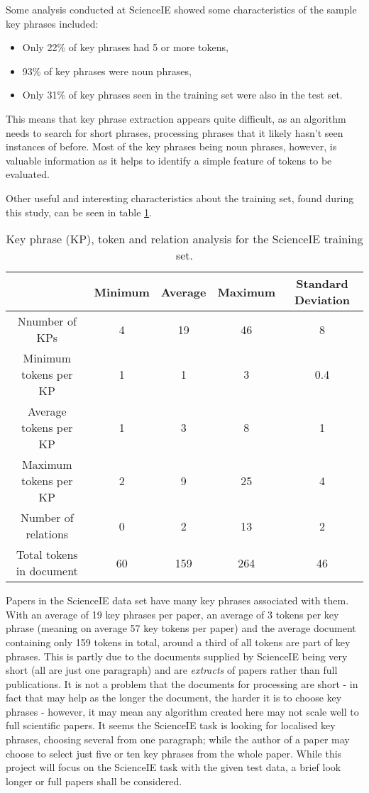 Some analysis conducted at ScienceIE \cite{Augenstein2017} showed some characteristics of the sample key phrases included:
\begin{itemize}
	\item Only 22\% of key phrases had 5 or more tokens,
	\item 93\% of key phrases were noun phrases,
	\item Only 31\% of key phrases seen in the training set were also in the test set.
\end{itemize}

This means that key phrase extraction appears quite difficult, as an algorithm needs to search for short phrases, processing phrases that it likely hasn't seen instances of before. Most of the key phrases being noun phrases, however, is valuable information as it helps to identify a simple feature of tokens to be evaluated.

Other useful and interesting characteristics about the training set, found during this study, can be seen in table \ref{table:traininganalysis}. 

\begin{table}
	\centering
	\begin{tabular}{ c | c c c c }
		& \textbf{Minimum} & \textbf{Average} & \textbf{Maximum} & \textbf{Standard Deviation} \\
		\hline
		Nnumber of KPs & 4 & 19 & 46 & 8 \\
		Minimum tokens per KP & 1 & 1 & 3 & 0.4 \\
		Average tokens per KP & 1 & 3 & 8 & 1 \\
		Maximum tokens per KP & 2 & 9 & 25 & 4 \\
		Number of relations & 0 & 2 & 13 & 2 \\
		Total tokens in document & 60 & 159 & 264 & 46
	\end{tabular}
	\caption[ScienceIE Training Set Analysis]{Key phrase (KP), token and relation analysis for the ScienceIE training set.}
	\label{table:traininganalysis}
\end{table}

Papers in the ScienceIE data set have many key phrases associated with them. With an average of 19 key phrases per paper, an average of 3 tokens per key phrase (meaning on average 57 key tokens per paper) and the average document containing only 159 tokens in total, around a third of all tokens are part of key phrases. This is partly due to the documents supplied by ScienceIE being very short (all are just one paragraph) and are \textit{extracts} of papers rather than full publications. It is not a problem that the documents for processing are short - in fact that may help as the longer the document, the harder it is to choose key phrases \cite{Hasan2014} - however, it may mean any algorithm created here may not scale well to full scientific papers. It seems the ScienceIE task is looking for localised key phrases, choosing several from one paragraph; while the author of a paper may choose to select just five or ten key phrases from the whole paper. While this project will focus on the ScienceIE task with the given test data, a brief look longer or full papers shall be considered.

